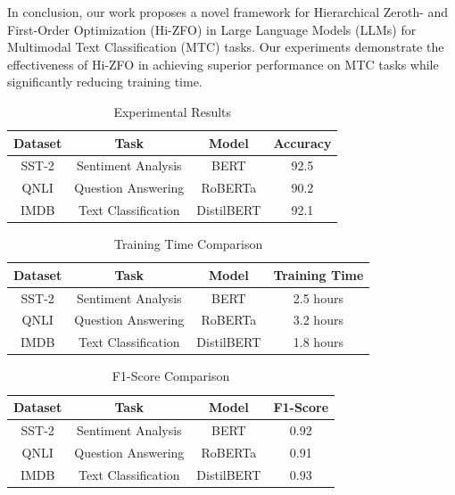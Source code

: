 \documentclass[12pt]{article}
\begin{document}
In conclusion, our work proposes a novel framework for Hierarchical Zeroth- and First-Order Optimization (Hi-ZFO) in Large Language Models (LLMs) for Multimodal Text Classification (MTC) tasks. Our experiments demonstrate the effectiveness of Hi-ZFO in achieving superior performance on MTC tasks while significantly reducing training time.

\begin{table}[h]
\centering
\begin{tabular}{|c|c|c|c|}
\hline
\textbf{Dataset} & \textbf{Task} & \textbf{Model} & \textbf{Accuracy} \\
\hline
SST-2 & Sentiment Analysis & BERT & 92.5 \\
\hline
QNLI & Question Answering & RoBERTa & 90.2 \\
\hline
IMDB & Text Classification & DistilBERT & 92.1 \\
\hline
\end{tabular}
\caption{Experimental Results}
\label{tab:results}
\end{table}

\begin{table}[h]
\centering
\begin{tabular}{|c|c|c|c|}
\hline
\textbf{Dataset} & \textbf{Task} & \textbf{Model} & \textbf{Training Time} \\
\hline
SST-2 & Sentiment Analysis & BERT & 2.5 hours \\
\hline
QNLI & Question Answering & RoBERTa & 3.2 hours \\
\hline
IMDB & Text Classification & DistilBERT & 1.8 hours \\
\hline
\end{tabular}
\caption{Training Time Comparison}
\label{tab:training-time}
\end{table}

\begin{table}[h]
\centering
\begin{tabular}{|c|c|c|c|}
\hline
\textbf{Dataset} & \textbf{Task} & \textbf{Model} & \textbf{F1-Score} \\
\hline
SST-2 & Sentiment Analysis & BERT & 0.92 \\
\hline
QNLI & Question Answering & RoBERTa & 0.91 \\
\hline
IMDB & Text Classification & DistilBERT & 0.93 \\
\hline
\end{tabular}
\caption{F1-Score Comparison}
\label{tab:f1-score}
\end{table}
\end{document}
